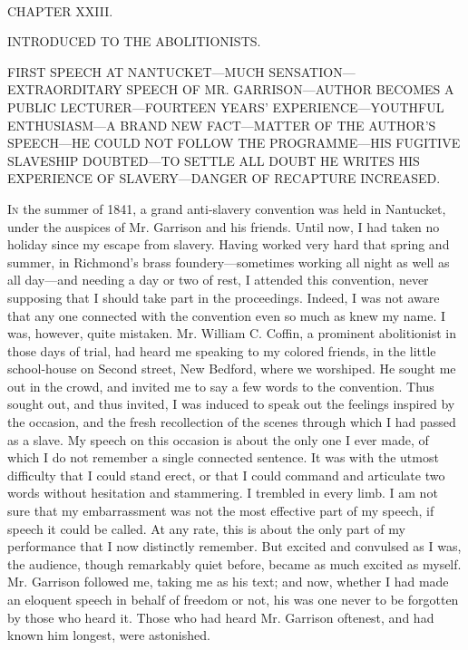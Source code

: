 {\protect\hypertarget{357}{}{}}

~

{CHAPTER XXIII.}

INTRODUCED TO THE ABOLITIONISTS.

{FIRST SPEECH AT NANTUCKET---MUCH SENSATION---{EXTRAORDITARY} SPEECH OF
MR. GARRISON---AUTHOR BECOMES A PUBLIC LECTURER---FOURTEEN YEARS'
EXPERIENCE---YOUTHFUL ENTHUSIASM---A BRAND NEW FACT---MATTER OF THE
AUTHOR'S SPEECH---HE COULD NOT FOLLOW THE PROGRAMME---HIS FUGITIVE
SLAVESHIP DOUBTED---TO SETTLE ALL DOUBT HE WRITES HIS EXPERIENCE OF
SLAVERY---DANGER OF RECAPTURE INCREASED.}

\textsc{In} the summer of 1841, a grand anti-slavery convention was held
in Nantucket, under the auspices of Mr. Garrison and his friends. Until
now, I had taken no holiday since my escape from slavery. Having worked
very hard that spring and summer, in Richmond's brass
foundery---sometimes working all night as well as all day---and needing
a day or two of rest, I attended this convention, never supposing that I
should take part in the proceedings. Indeed, I was not aware that any
one connected with the convention even so much as knew my name. I was,
however, quite mistaken. Mr. William C. Coffin, a prominent abolitionist
in those days of trial, had heard me speaking to my colored friends, in
the little school-house on Second street, New Bedford, where we
worshiped. He sought me out in the crowd, and invited me to say a few
words to the convention. Thus sought out, and thus invited, I was
induced to speak {\protect\hypertarget{358}{}{}}out the feelings
inspired by the occasion, and the fresh recollection of the scenes
through which I had passed as a slave. My speech on this occasion is
about the only one I ever made, of which I do not remember a single
connected sentence. It was with the utmost difficulty that I could stand
erect, or that I could command and articulate two words without
hesitation and stammering. I trembled in every limb. I am not sure that
my embarrassment was not the most effective part of my speech, if speech
it could be called. At any rate, this is about the only part of my
performance that I now distinctly remember. But excited and convulsed as
I was, the audience, though remarkably quiet before, became as much
excited as myself. Mr. Garrison followed me, taking me as his text; and
now, whether I had made an eloquent speech in behalf of freedom or not,
his was one never to be forgotten by those who heard it. Those who had
heard Mr. Garrison oftenest, and had known him longest, were astonished.
